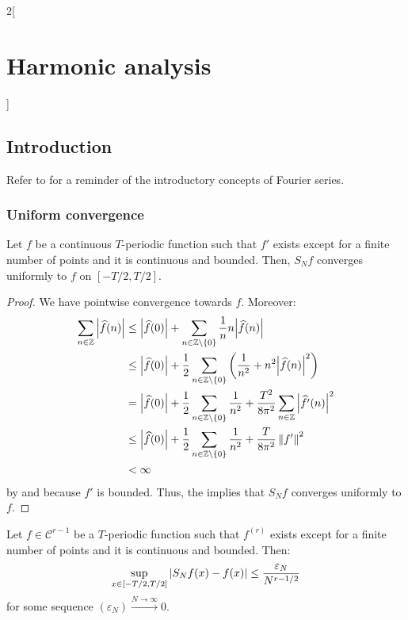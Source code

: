 \documentclass[../../../main_math.tex]{subfiles}
\begin{document}
\begin{multicols}{2}[\section{Harmonic analysis}]
  \subsection{Introduction}
  Refer to  for a reminder of the introductory concepts of Fourier series.
  \subsubsection{Uniform convergence}
  \begin{theorem}
    Let $f$ be a continuous $T$-periodic function such that $f'$ exists except for a finite number of points and it is continuous and bounded. Then, $S_Nf$ converges uniformly to $f$ on $[-T/2,T/2]$.
  \end{theorem}
  \begin{proof}
    We have pointwise convergence towards $f$. Moreover:
    \begin{align*}
      \sum_{n\in\mathbb{Z}}\abs{\widehat{f}(n)} & \leq\abs{\widehat{f}(0)}+ \sum_{n\in\mathbb{Z}\setminus\{0\}}\frac{1}{n}n\abs{\widehat{f}(n)}                                             \\
                                         & \leq\abs{\widehat{f}(0)}+\frac{1}{2}\sum_{n\in\mathbb{Z}\setminus\{0\}}\left(\frac{1}{n^2} + n^2\abs{\widehat{f}(n)}^2\right)             \\
                                         & =\abs{\widehat{f}(0)}+\frac{1}{2}\sum_{n\in\mathbb{Z}\setminus\{0\}}\frac{1}{n^2}+\frac{T^2}{8\pi^2}\sum_{n\in\mathbb{Z}}\abs{\widehat{f'}(n)}^2 \\
                                         & \leq\abs{\widehat{f}(0)}+\frac{1}{2}\sum_{n\in\mathbb{Z}\setminus\{0\}}\frac{1}{n^2}+\frac{T}{8\pi^2}\left\|f'\right\|^2                          \\
                                         & <\infty
    \end{align*}
    by  and because $f'$ is bounded. Thus, the  implies that $S_Nf$ converges uniformly to $f$.
  \end{proof}
  \begin{corollary}
    Let $f\in\mathcal{C}^{r-1}$ be a $T$-periodic function such that $f^{(r)}$ exists except for a finite number of points and it is continuous and bounded. Then: $$\sup_{x\in[-T/2,T/2]}\abs{S_Nf(x)-f(x)}\leq \frac{\varepsilon_N}{N^{r-1/2}}$$ for some sequence $(\varepsilon_N)\overset{N\to\infty}{\longrightarrow}0$.

\end{corollary}
\end{multicols}
\end{document}
